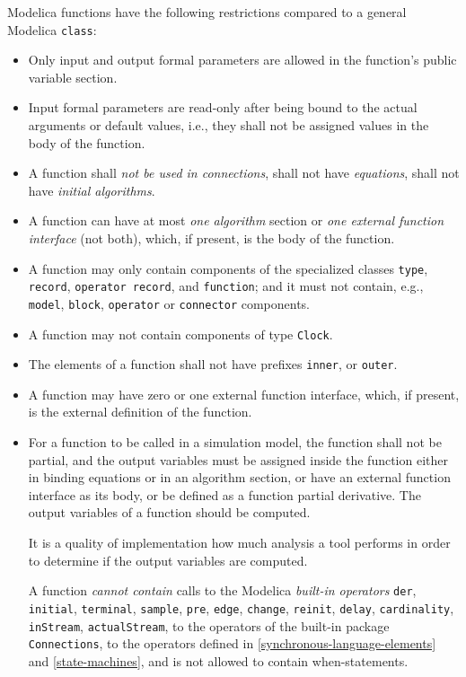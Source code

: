 Modelica functions have the following restrictions compared to a general
Modelica \lstinline!class!:
\begin{itemize}
\item
  Only input and output formal parameters are allowed in the function's public variable section.
\item
  Input formal parameters are read-only after being bound to the actual
  arguments or default values, i.e., they shall not be assigned values in
  the body of the function.
\item
  A function shall \emph{not be used in connections}, shall not have
  \emph{equations}, shall not have \emph{initial algorithms}.
\item
  A function can have at most \emph{one algorithm} section or \emph{one
  external function interface} (not both), which, if present, is the
  body of the function.
\item
  A function may only contain components of the specialized classes \lstinline!type!, \lstinline!record!, \lstinline!operator record!, and \lstinline!function!; and it must not contain, e.g., \lstinline!model!, \lstinline!block!, \lstinline!operator! or \lstinline!connector! components.
\item
  A function may not contain components of type \lstinline!Clock!.
\item
  The elements of a function shall not have prefixes \lstinline!inner!, or \lstinline!outer!.
\item
  A function may have zero or one external function interface, which, if
  present, is the external definition of the function.
\item
  For a function to be called in a simulation model, the function shall
  not be partial, and the output variables must be assigned inside the
  function either in binding equations or in an algorithm section,
  or have an external function interface as its body, or be defined as a
  function partial derivative. The output variables of a function should
  be computed.
  \begin{nonnormative}
  It is a quality of implementation how much analysis a tool performs in order to determine if the output variables are computed.
  \end{nonnormative}
  A function \emph{cannot contain} calls to the Modelica \emph{built-in operators} \lstinline!der!, \lstinline!initial!, \lstinline!terminal!, \lstinline!sample!, \lstinline!pre!, \lstinline!edge!, \lstinline!change!, \lstinline!reinit!, \lstinline!delay!, \lstinline!cardinality!, \lstinline!inStream!, \lstinline!actualStream!, to the operators of the built-in package \lstinline!Connections!, to the operators defined in \cref{synchronous-language-elements} and \cref{state-machines}, and is not allowed to contain when-statements.

\end{itemize}
